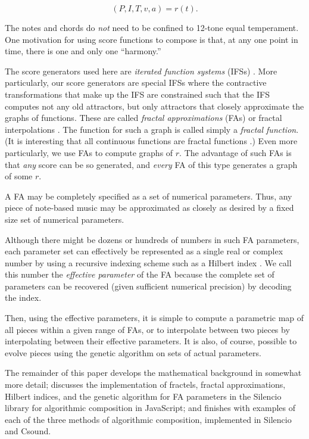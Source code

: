 \documentclass[english,11pt,letterpaper,onecolumn]{scrartcl}
\numberwithin{equation}{section}
\begin{document}
$$(P, I, T, v, a) = r(t).$$

\noindent The notes and chords do \textit{not} need to be confined to  12-tone
equal temperament. One motivation for using score functions to compose is that,
at any one point in time, there is one and only one ``harmony.''

The score generators used here are \textit{iterated function systems} (IFSs)
\cite{barnsley1985iterated, 10.2307/24893080, fractalseverywhere}. More
particularly, our score generators are special IFSs where the contractive
transformations that make up the IFS are constrained such that the IFS computes
not any old attractors, but only attractors that closely approximate the graphs
of functions. These are called \textit{fractal approximations} (FAs) or fractal
interpolations \cite{Barnsley1986, fractalseverywhere, navascues2014fractal}.
The function for such a graph is called simply a \textit{fractal function}. (It
is interesting that all continuous functions are fractal functions
\cite{2016arXiv161001369B}.) Even more particularly, we use FAs to compute
graphs of $r$. The advantage of such FAs is that \textit{any} score can be so
generated, and \textit{every} FA of this type generates a graph of some $r$.

A FA may be completely specified as a set of numerical parameters. Thus, any
piece of note-based music may be approximated as closely as desired by a fixed
size set of numerical parameters.

Although there might be dozens or hundreds of numbers in such FA parameters,
each parameter set can effectively be represented as a single real or complex
number by using a recursive indexing scheme such as a Hilbert index
\cite{hamilton2006compact}. We call this number the \textit{effective parameter}
of the FA because the complete set of parameters can be recovered (given
sufficient numerical precision) by decoding the index.

Then, using the effective parameters, it is simple to compute a parametric map
of all pieces within a given range of FAs, or to interpolate between two pieces
by interpolating between their effective parameters. It is also, of course,
possible to evolve pieces using the genetic algorithm on sets of actual
parameters.

The remainder of this paper develops the mathematical background in somewhat
more detail; discusses the implementation of fractels, fractal approximations,
Hilbert indices, and the genetic algorithm for FA parameters in the Silencio
library for algorithmic composition in JavaScript; and finishes with examples of
each of the three methods of algorithmic composition, implemented in Silencio
and Csound.
\end{document}
